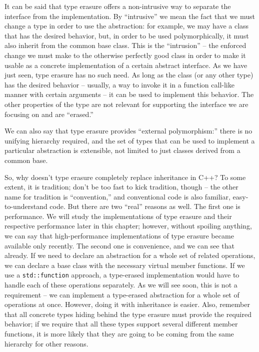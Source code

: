It can be said that type erasure offers a non-intrusive way to separate the interface from the implementation. By ``intrusive'' we mean the fact that we must change a type in order to use the abstraction: for example, we may have a class that has the desired behavior, but, in order to be used polymorphically, it must also inherit from the common base class. This is the ``intrusion'' -- the enforced change we must make to the otherwise perfectly good class in order to make it usable as a concrete implementation of a certain abstract interface. As we have just seen, type erasure has no such need. As long as the class (or any other type) has the desired behavior -- usually, a way to invoke it in a function call-like manner with certain arguments -- it can be used to implement this behavior. The other properties of the type are not relevant for supporting the interface we are focusing on and are ``erased.''

We can also say that type erasure provides ``external polymorphism:'' there is no unifying hierarchy required, and the set of types that can be used to implement a particular abstraction is extensible, not limited to just classes derived from a common base.

So, why doesn't type erasure completely replace inheritance in C++? To some extent, it is tradition; don't be too fast to kick tradition, though -- the other name for tradition is ``convention,'' and conventional code is also familiar, easy-to-understand code. But there are two ``real'' reasons as well. The first one is performance. We will study the implementations of type erasure and their respective performance later in this chapter; however, without spoiling anything, we can say that high-performance implementations of type erasure became available only recently. The second one is convenience, and we can see that already. If we need to declare an abstraction for a whole set of related operations, we can declare a base class with the necessary virtual member functions. If we use a \texttt{std::function} approach, a type-erased implementation would have to handle each of these operations separately. As we will see soon, this is not a requirement -- we can implement a type-erased abstraction for a whole set of operations at once. However, doing it with inheritance is easier. Also, remember that all concrete types hiding behind the type erasure must provide the required behavior; if we require that all these types support several different member functions, it is more likely that they are going to be coming from the same hierarchy for other reasons.

